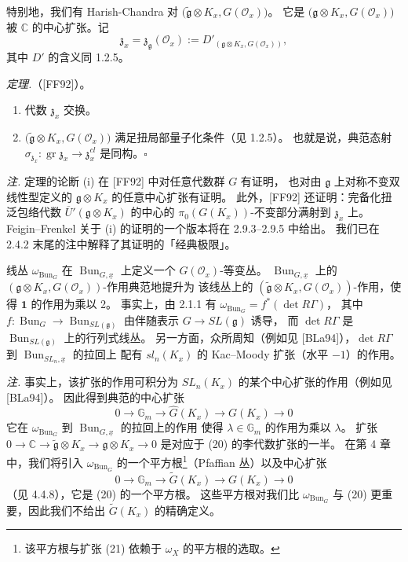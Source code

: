 特别地，我们有 Harish-Chandra 对 $\bigl(\tilde{\mathfrak{g}}\otimes K_x, G(\mathcal{O}_x)\bigr)$。
它是 $\bigl(\mathfrak{g}\otimes K_x, G(\mathcal{O}_x)\bigr)$ 被 $\mathbb{C}$ 的中心扩张。记
\[
\mathfrak{z}_x=\mathfrak{z}_{\mathfrak{g}}(\mathcal{O}_x):=D'_{(\mathfrak{g}\otimes K_x,G(\mathcal{O}_x))},
\]
其中 $D'$ 的含义同 1.2.5。

\emph{定理.}（[FF92]）。
\begin{enumerate}[label=(\roman*),leftmargin=2.2em]
\item 代数 $\mathfrak{z}_x$ 交换。
\item $\bigl(\tilde{\mathfrak{g}}\otimes K_x, G(\mathcal{O}_x)\bigr)$ 满足扭局部量子化条件（见 1.2.5）。
  也就是说，典范态射 $\sigma_{\mathfrak{z}_x}: \operatorname{gr}\mathfrak{z}_x\to\mathfrak{z}^{cl}_x$ 是同构。\hfill$\square$
\end{enumerate}

\emph{注.} 定理的论断 (i) 在 [FF92] 中对任意代数群 $G$ 有证明，
也对由 $\mathfrak{g}$ 上对称不变双线性型定义的 $\mathfrak{g}\otimes K_x$ 的任意中心扩张有证明。
此外，[FF92] 还证明：完备化扭泛包络代数 $\overline{U}'(\mathfrak{g}\otimes K_x)$ 的中心的
$\pi_0(G(K_x))$-不变部分满射到 $\mathfrak{z}_x$ 上。
Feigin–Frenkel 关于 (i) 的证明的一个版本将在 2.9.3–2.9.5 中给出。
我们已在 2.4.2 末尾的注中解释了其证明的「经典极限」。

 线丛 $\omega_{\operatorname{Bun}_G}$ 在 $\operatorname{Bun}_{G,\underline{x}}$ 上定义一个 $G(\mathcal{O}_x)$-等变丛。
$\operatorname{Bun}_{G,\underline{x}}$ 上的 $(\mathfrak{g}\otimes K_x, G(\mathcal{O}_x))$-作用典范地提升为
该线丛上的 $(\tilde{\mathfrak{g}}\otimes K_x, G(\mathcal{O}_x))$-作用，使得 $\mathbf{1}$ 的作用为乘以 2。
事实上，由 2.1.1 有 $\omega_{\operatorname{Bun}_G}=f^*(\det R\Gamma)$，
其中 $f: \operatorname{Bun}_G\to\operatorname{Bun}_{SL(\mathfrak{g})}$ 由伴随表示 $G\to SL(\mathfrak{g})$ 诱导，
而 $\det R\Gamma$ 是 $\operatorname{Bun}_{SL(\mathfrak{g})}$ 上的行列式线丛。
另一方面，众所周知（例如见 [BLa94]），$\det R\Gamma$ 到 $\operatorname{Bun}_{SL_n,\underline{x}}$ 的拉回上
配有 $sl_n(K_x)$ 的 Kac–Moody 扩张（水平 $-1$）的作用。

\emph{注.} 事实上，该扩张的作用可积分为 $SL_n(K_x)$ 的某个中心扩张的作用（例如见 [BLa94]）。
因此得到典范的中心扩张
\begin{equation}\tag{20}
0\to\mathbb{G}_m\to\hat{G}(K_x)\to G(K_x)\to 0
\end{equation}
它在 $\omega_{\operatorname{Bun}_G}$ 到 $\operatorname{Bun}_{G,\underline{x}}$ 的拉回上的作用
使得 $\lambda\in\mathbb{G}_m$ 的作用为乘以 $\lambda$。
扩张 $0\to\mathbb{C}\to\tilde{\mathfrak{g}}\otimes K_x\to\mathfrak{g}\otimes K_x\to 0$
是对应于 (20) 的李代数扩张的一半。
在第 4 章中，我们将引入 $\omega_{\operatorname{Bun}_G}$ 的一个平方根\footnote{该平方根与扩张 (21) 依赖于 $\omega_X$ 的平方根的选取。}（Pfaffian 丛）以及中心扩张
\begin{equation}\tag{21}
0\to\mathbb{G}_m\to\tilde{G}(K_x)\to G(K_x)\to 0
\end{equation}
（见 4.4.8），它是 (20) 的一个平方根。
这些平方根对我们比 $\omega_{\operatorname{Bun}_G}$ 与 (20) 更重要，因此我们不给出 $\tilde{G}(K_x)$ 的精确定义。

